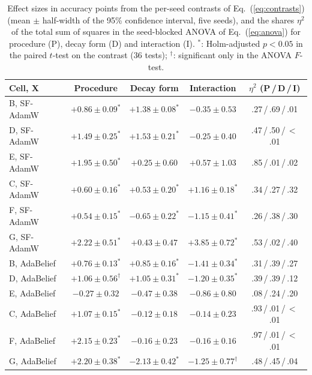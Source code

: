 \begin{table}[!t]
\caption{Effect sizes in accuracy points from the per-seed contrasts of Eq.~(\ref{eq:contrasts}) (mean $\pm$ half-width of the 95\% confidence interval, five seeds), and the shares $\eta^2$ of the total sum of squares in the seed-blocked ANOVA of Eq.~(\ref{eq:anova}) for procedure (P), decay form (D) and interaction (I). $^{*}$: Holm-adjusted $p<0.05$ in the paired $t$-test on the contrast (36 tests); $^{\dagger}$: significant only in the ANOVA $F$-test.}
\label{tab:est}
\centering
\footnotesize
\setlength{\tabcolsep}{4pt}
\begin{tabular}{@{}lcccc@{}}
\toprule
Cell, X & Procedure & Decay form & Interaction & $\eta^2$ (P\,/\,D\,/\,I) \\
\midrule
B, SF-AdamW & $+0.86\pm0.09^{*}$ & $+1.38\pm0.08^{*}$ & $-0.35\pm0.53$ & .27\,/\,.69\,/\,.01 \\
D, SF-AdamW & $+1.49\pm0.25^{*}$ & $+1.53\pm0.21^{*}$ & $-0.25\pm0.40$ & .47\,/\,.50\,/\,$<$.01 \\
E, SF-AdamW & $+1.95\pm0.50^{*}$ & $+0.25\pm0.60$ & $+0.57\pm1.03$ & .85\,/\,.01\,/\,.02 \\
C, SF-AdamW & $+0.60\pm0.16^{*}$ & $+0.53\pm0.20^{*}$ & $+1.16\pm0.18^{*}$ & .34\,/\,.27\,/\,.32 \\
F, SF-AdamW & $+0.54\pm0.15^{*}$ & $-0.65\pm0.22^{*}$ & $-1.15\pm0.41^{*}$ & .26\,/\,.38\,/\,.30 \\
G, SF-AdamW & $+2.22\pm0.51^{*}$ & $+0.43\pm0.47$ & $+3.85\pm0.72^{*}$ & .53\,/\,.02\,/\,.40 \\
\midrule
B, AdaBelief & $+0.76\pm0.13^{*}$ & $+0.85\pm0.16^{*}$ & $-1.41\pm0.34^{*}$ & .31\,/\,.39\,/\,.27 \\
D, AdaBelief & $+1.06\pm0.56^{\dagger}$ & $+1.05\pm0.31^{*}$ & $-1.20\pm0.35^{*}$ & .39\,/\,.39\,/\,.12 \\
E, AdaBelief & $-0.27\pm0.32$ & $-0.47\pm0.38$ & $-0.86\pm0.80$ & .08\,/\,.24\,/\,.20 \\
C, AdaBelief & $+1.07\pm0.15^{*}$ & $-0.12\pm0.18$ & $-0.14\pm0.23$ & .93\,/\,.01\,/\,$<$.01 \\
F, AdaBelief & $+2.15\pm0.23^{*}$ & $-0.16\pm0.23$ & $-0.16\pm0.16$ & .97\,/\,.01\,/\,$<$.01 \\
G, AdaBelief & $+2.20\pm0.38^{*}$ & $-2.13\pm0.42^{*}$ & $-1.25\pm0.77^{\dagger}$ & .48\,/\,.45\,/\,.04 \\
\bottomrule
\end{tabular}
\end{table}
